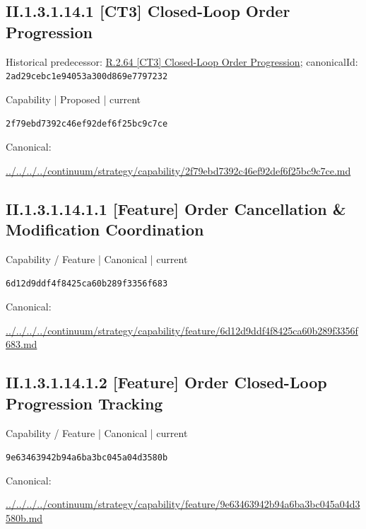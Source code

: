 \documentclass[10pt,a4paper]{article}
\begin{document}
\subsection*{II.1.3.1.14.1 [CT3] Closed-Loop Order Progression}
Historical predecessor: \hyperref[element-2ad29cebc1e94053a300d869e7797232]{R.2.64 [CT3] Closed-Loop Order Progression}; canonicalId: \texttt{2ad29cebc1e94053a300d869e7797232}\par
\label{element-2f79ebd7392c46ef92def6f25bc9c7ce}
{\small Capability | Proposed | current}\par
\texttt{2f79ebd7392c46ef92def6f25bc9c7ce}\par
Canonical: \par
{\footnotesize\url{../../../../continuum/strategy/capability/2f79ebd7392c46ef92def6f25bc9c7ce.md}}\par
\subsection*{II.1.3.1.14.1.1 [Feature] Order Cancellation \& Modification Coordination}
\label{element-6d12d9ddf4f8425ca60b289f3356f683}
{\small Capability / Feature | Canonical | current}\par
\texttt{6d12d9ddf4f8425ca60b289f3356f683}\par
Canonical: \par
{\footnotesize\url{../../../../continuum/strategy/capability/feature/6d12d9ddf4f8425ca60b289f3356f683.md}}\par
\subsection*{II.1.3.1.14.1.2 [Feature] Order Closed-Loop Progression Tracking}
\label{element-9e63463942b94a6ba3bc045a04d3580b}
{\small Capability / Feature | Canonical | current}\par
\texttt{9e63463942b94a6ba3bc045a04d3580b}\par
Canonical: \par
{\footnotesize\url{../../../../continuum/strategy/capability/feature/9e63463942b94a6ba3bc045a04d3580b.md}}\par
\end{document}
